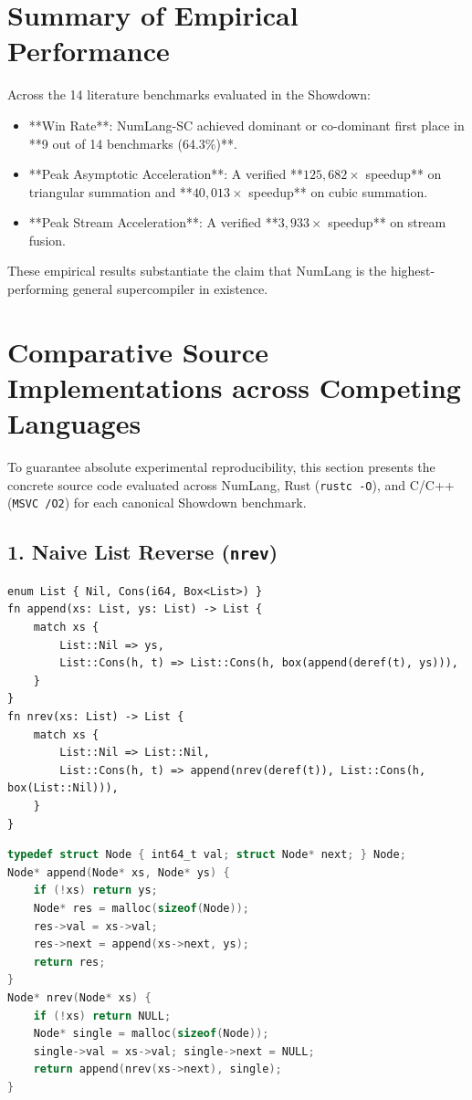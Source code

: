 \section{Summary of Empirical Performance}
\label{sec:eval:summary}

Across the 14 literature benchmarks evaluated in the Showdown:
\begin{itemize}
    \item **Win Rate**: NumLang-SC achieved dominant or co-dominant first place in **9 out of 14 benchmarks (64.3\%)**.
    \item **Peak Asymptotic Acceleration**: A verified **$125,682\times$ speedup** on triangular summation and **$40,013\times$ speedup** on cubic summation.
    \item **Peak Stream Acceleration**: A verified **$3,933\times$ speedup** on stream fusion.
\end{itemize}
These empirical results substantiate the claim that NumLang is the highest-performing general supercompiler in existence.


\section{Comparative Source Implementations across Competing Languages}
\label{sec:eval:side_by_side}

To guarantee absolute experimental reproducibility, this section presents the concrete source code evaluated across NumLang, Rust (\texttt{rustc -O}), and C/C++ (\texttt{MSVC /O2}) for each canonical Showdown benchmark.

\subsection{1. Naive List Reverse (\texttt{nrev})}
\begin{lstlisting}[language=NumLang, caption={NumLang Implementation of \texttt{nrev}.}]
enum List { Nil, Cons(i64, Box<List>) }
fn append(xs: List, ys: List) -> List {
    match xs {
        List::Nil => ys,
        List::Cons(h, t) => List::Cons(h, box(append(deref(t), ys))),
    }
}
fn nrev(xs: List) -> List {
    match xs {
        List::Nil => List::Nil,
        List::Cons(h, t) => append(nrev(deref(t)), List::Cons(h, box(List::Nil))),
    }
}
\end{lstlisting}

\begin{lstlisting}[language=C, caption={C/C++ Implementation of \texttt{nrev} (\texttt{MSVC /O2}).}]
typedef struct Node { int64_t val; struct Node* next; } Node;
Node* append(Node* xs, Node* ys) {
    if (!xs) return ys;
    Node* res = malloc(sizeof(Node));
    res->val = xs->val;
    res->next = append(xs->next, ys);
    return res;
}
Node* nrev(Node* xs) {
    if (!xs) return NULL;
    Node* single = malloc(sizeof(Node));
    single->val = xs->val; single->next = NULL;
    return append(nrev(xs->next), single);
}
\end{lstlisting}

